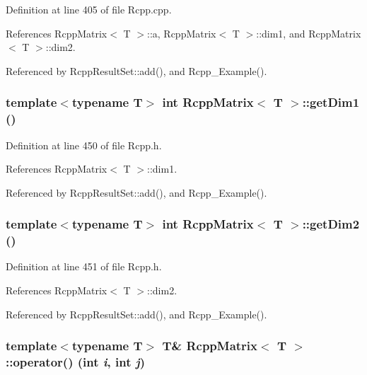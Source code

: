 Definition at line 405 of file Rcpp.cpp.

References RcppMatrix$<$ T $>$::a, RcppMatrix$<$ T $>$::dim1, and RcppMatrix$<$ T $>$::dim2.

Referenced by RcppResultSet::add(), and Rcpp\_\-Example().\hypertarget{classRcppMatrix_edbe27d643d704a0f5a995821307fdaf}{
\subsubsection[{getDim1}]{\setlength{\rightskip}{0pt plus 5cm}template$<$typename T$>$ int {\bf RcppMatrix}$<$ T $>$::getDim1 ()}}
\label{classRcppMatrix_edbe27d643d704a0f5a995821307fdaf}




Definition at line 450 of file Rcpp.h.

References RcppMatrix$<$ T $>$::dim1.

Referenced by RcppResultSet::add(), and Rcpp\_\-Example().\hypertarget{classRcppMatrix_356e04f844e3ebfac29b50e2e749734f}{
\subsubsection[{getDim2}]{\setlength{\rightskip}{0pt plus 5cm}template$<$typename T$>$ int {\bf RcppMatrix}$<$ T $>$::getDim2 ()}}
\label{classRcppMatrix_356e04f844e3ebfac29b50e2e749734f}




Definition at line 451 of file Rcpp.h.

References RcppMatrix$<$ T $>$::dim2.

Referenced by RcppResultSet::add(), and Rcpp\_\-Example().\hypertarget{classRcppMatrix_7733c87524d7e216f70fc10ccc971a29}{
\subsubsection[{operator()}]{\setlength{\rightskip}{0pt plus 5cm}template$<$typename T$>$ T\& {\bf RcppMatrix}$<$ T $>$::operator() (int {\em i}, \/  int {\em j})}}
\label{classRcppMatrix_7733c87524d7e216f70fc10ccc971a29}




